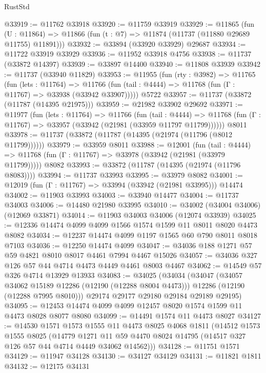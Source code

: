 \begin{lexlean}{RustStd}
\begin{coremodule}
@33919 := @11762 @33918
@33920 := @11759 @33919
@33929 := @11865
    (fun (U : @11864) => @11866 (fun (t : @7) => @11874 (@11737 (@11880 @29689 @11755) @11891)))
@33932 := @33894 (@33920 @33929) @29687
@33934 := @11722 @33919 @33929
@33936 := @11952 @33918 @4756
@33938 := @11737 (@33872 @14397)
@33939 := @33897 @14400
@33940 := @11808 @33939
@33942 := @11737 (@33940 @11829)
@33953 := @11955
    (fun (rty : @3982) =>
    @11765
      (fun (lets : @11764) =>
      @11766 (fun (tail : @4444) => @11768 (fun (Γ : @11767) => @33938 (@33942 @33907)))))
    @5722
@33957 := @11737 (@33872 (@11787 (@14395 @21975)))
@33959 := @21982 @33902 @29692
@33971 := @11977
    (fun (lets : @11764) =>
    @11766
      (fun (tail : @4444) =>
      @11768 (fun (Γ : @11767) => @33957 (@33942 (@21981 (@33959 @11797 @11799))))))
    @8011
@33978 := @11737 (@33872 (@11787 (@14395 (@21974 (@11796 (@8012 @11799))))))
@33979 := @33959 @8011
@33988 := @12001
    (fun (tail : @4444) => @11768 (fun (Γ : @11767) => @33978 (@33942 (@21981 (@33979 @11799)))))
    @8082
@33993 := @33872 (@11787 (@14395 (@21974 (@11796 @8083))))
@33994 := @11737 @33993
@33995 := @33979 @8082
@34001 := @12019 (fun (Γ : @11767) => @33994 (@33942 (@21981 @33995))) @14474
@34002 := @11903 @33993
@34003 := @33940 @14477
@34004 := @11737 @34003
@34006 := @14480 @21980 @33995
@34010 := @34002 (@34004 @34006) (@12069 @33871)
@34014 := @11903 @34003 @34006 (@12074 @33939)
@34025 := @12336 @14474 @4099 @4099 @1566 @1574 @1599 @11 @8011 @8020 @4473 @8082
@34034 := @12237 @14474 @4099 @1197 @1565 @60 @790 @8011 @8018 @7103
@34036 := @12250 @14474 @4099
@34047 := @34036 @188 @1271 @57 @59 @4821 @8010 @8017 @4461 @7994 @4467 @15026
@34057 := @34036 @327 @126 @57 @44 @4714 @4473 @4449 @4461 @8003 @4467
@34062 := @14549 @57 @326 @4714 @13929 @13933
@34083 := @34025
    (@34034
      (@34047
        (@34057 @34062 @15189 @12286 (@12190 (@12288 @8004 @4473)))
        @12286
        (@12190 (@12288 @7995 @8010)))
      @29174
      @29177
      @29180
      @29184
      @29189
      @29195)
@34095 := @12453 @14474 @4099 @4099 @12457 @8020 @1574 @1599 @11 @4473 @8028 @8077 @8080
@34099 := @14491 @1574 @11 @4473 @8027
@34127 := @14530
    @1571
    @1573
    @1555
    @11
    @4473
    @8025
    @4068
    @1811
    (@14512
      @1573
      @1555
      @8025
      (@14779
        @1271
        @11
        @59
        @4470
        @8024
        @14795
        (@14517 @327 @126 @57 @44 @4714 @4449 @34062 @14562)))
@34128 := @11751 @1571
@34129 := @11947 @34128
@34130 := @34127 @34129
@34131 := @11821 @1811
@34132 := @12175 @34131

\end{coremodule}
\end{lexlean}
